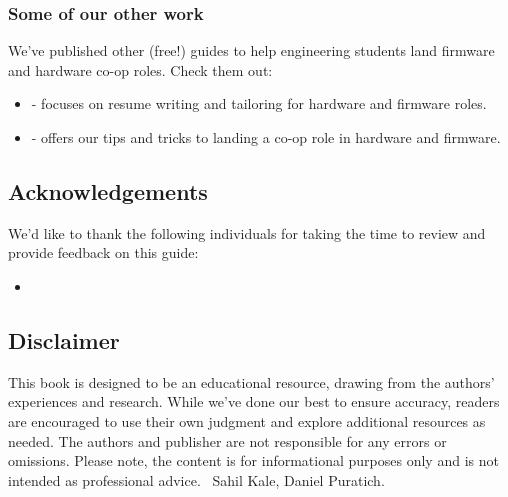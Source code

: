 \documentclass[main.tex]{subfiles}
\begin{document}
\subsubsection{Some of our other work}
We've published other (free!) guides to help engineering students land firmware and hardware co-op roles. Check them out:
\begin{itemize}
    \item {} - focuses on resume writing and tailoring for hardware and firmware roles.
    \item {} - offers our tips and tricks to landing a co-op role in hardware and firmware.
\end{itemize}


\subsection{Acknowledgements}
We'd like to thank the following individuals for taking the time to review and provide feedback on this guide:
\begin{itemize}
    \item
\end{itemize}

\subsection{Disclaimer}
This book is designed to be an educational resource, drawing from the authors' experiences and research. While we've done our best to ensure accuracy, readers are encouraged to use their own judgment and explore additional resources as needed. The authors and publisher are not responsible for any errors or omissions. Please note, the content is for informational purposes only and is not intended as professional advice.
\newline
\newnoindentpara \textcopyright \ Sahil Kale, Daniel Puratich.
\end{document}
